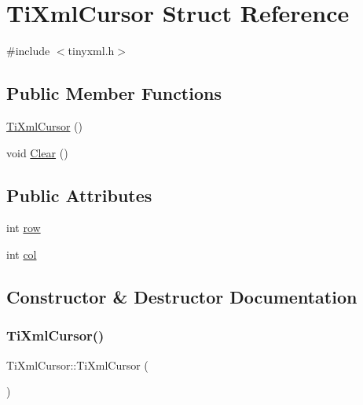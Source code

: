 \hypertarget{struct_ti_xml_cursor}{}\section{Ti\+Xml\+Cursor Struct Reference}
\label{struct_ti_xml_cursor}


{\ttfamily \#include $<$tinyxml.\+h$>$}

\subsection*{Public Member Functions}
\begin{DoxyCompactItemize}
\item 
\hyperlink{struct_ti_xml_cursor_a7ad233928a675f0271eb440b150e3ff1}{Ti\+Xml\+Cursor} ()
\item 
void \hyperlink{struct_ti_xml_cursor_a1e6fa622b59dafb71b6efe595105dcdd}{Clear} ()
\end{DoxyCompactItemize}
\subsection*{Public Attributes}
\begin{DoxyCompactItemize}
\item 
int \hyperlink{struct_ti_xml_cursor_a5b54dd949820c2db061e2be41f3effb3}{row}
\item 
int \hyperlink{struct_ti_xml_cursor_a5694d7ed2c4d20109d350c14c417969d}{col}
\end{DoxyCompactItemize}


\subsection{Constructor \& Destructor Documentation}
\mbox{\label{struct_ti_xml_cursor_a7ad233928a675f0271eb440b150e3ff1}} 
\subsubsection{\texorpdfstring{Ti\+Xml\+Cursor()}{TiXmlCursor()}}
{\footnotesize\ttfamily Ti\+Xml\+Cursor\+::\+Ti\+Xml\+Cursor (\begin{DoxyParamCaption}{ }\end{DoxyParamCaption})\hspace{0.3cm}{\ttfamily [inline]}}

